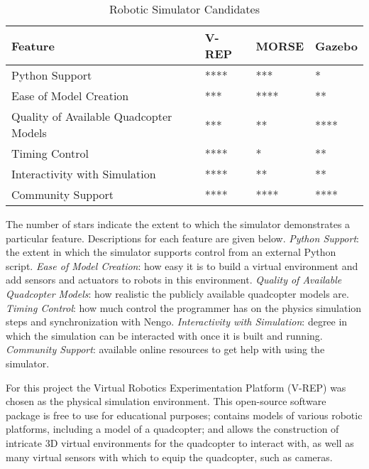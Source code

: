 \documentclass[letterpaper,12pt,titlepage,oneside,final]{book}
\begin{document}
\begin{table}
\begin{threeparttable}
\caption{Robotic Simulator Candidates} \label{table:robot_simulators}
\begin{tabularx}{\textwidth}{| X | l | l | l |}
\hline
\textbf{Feature} & \textbf{V-REP} & \textbf{MORSE} & \textbf{Gazebo} \\ \hline
Python Support & **** & *** & * \\ \hline
Ease of Model Creation & *** & **** & ** \\ \hline
Quality of Available Quadcopter Models & *** & ** & **** \\ \hline
Timing Control & **** & * & ** \\ \hline
Interactivity with Simulation & **** & ** & ** \\ \hline
Community Support & **** & **** & **** \\ \hline
\end{tabularx}
\begin{tablenotes}
\footnotesize
\item The number of stars indicate the extent to which the simulator demonstrates a particular feature.
Descriptions for each feature are given below.
\textit{Python Support}: the extent in which the simulator supports control from an external Python script.
\textit{Ease of Model Creation}: how easy it is to build a virtual environment and add sensors and actuators to robots in this environment.
\textit{Quality of Available Quadcopter Models}: how realistic the publicly available quadcopter models are.
\textit{Timing Control}: how much control the programmer has on the physics simulation steps and synchronization with Nengo.
\textit{Interactivity with Simulation}: degree in which the simulation can be interacted with once it is built and running.
\textit{Community Support}: available online resources to get help with using the simulator.
\end{tablenotes}
\end{threeparttable}
\end{table}

For this project the Virtual Robotics Experimentation Platform (V-REP) was chosen as the physical simulation environment.
This open-source software package is free to use for educational purposes; 
contains models of various robotic platforms, including a model of a quadcopter; 
and allows the construction of intricate 3D virtual environments for the quadcopter to interact with, as well as many virtual sensors with which to equip the quadcopter, such as cameras.
\end{document}
